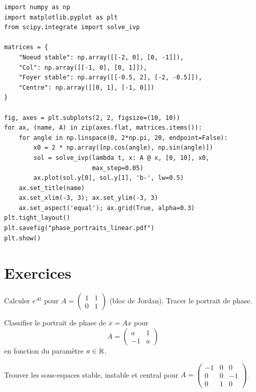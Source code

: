 \begin{codeblock}[title=\textbf{Portraits de phase pour diff\'erentes matrices}]
\begin{verbatim}
import numpy as np
import matplotlib.pyplot as plt
from scipy.integrate import solve_ivp

matrices = {
    "Noeud stable": np.array([[-2, 0], [0, -1]]),
    "Col": np.array([[-1, 0], [0, 1]]),
    "Foyer stable": np.array([[-0.5, 2], [-2, -0.5]]),
    "Centre": np.array([[0, 1], [-1, 0]])
}

fig, axes = plt.subplots(2, 2, figsize=(10, 10))
for ax, (name, A) in zip(axes.flat, matrices.items()):
    for angle in np.linspace(0, 2*np.pi, 20, endpoint=False):
        x0 = 2 * np.array([np.cos(angle), np.sin(angle)])
        sol = solve_ivp(lambda t, x: A @ x, [0, 10], x0,
                        max_step=0.05)
        ax.plot(sol.y[0], sol.y[1], 'b-', lw=0.5)
    ax.set_title(name)
    ax.set_xlim(-3, 3); ax.set_ylim(-3, 3)
    ax.set_aspect('equal'); ax.grid(True, alpha=0.3)
plt.tight_layout()
plt.savefig("phase_portraits_linear.pdf")
plt.show()
\end{verbatim}
\end{codeblock}

\section{Exercices}

\begin{exercice}
Calculer $e^{At}$ pour $A = \begin{pmatrix} 1 & 1 \\ 0 & 1 \end{pmatrix}$
(bloc de Jordan). Tracer le portrait de phase.
\end{exercice}

\begin{exercice}[Classification]
Classifier le portrait de phase de $\dot{x} = Ax$ pour
\[
    A = \begin{pmatrix} a & 1 \\ -1 & a \end{pmatrix}
\]
en fonction du param\`etre $a \in \mathbb{R}$.
\end{exercice}

\begin{exercice}[Dimension 3]
Trouver les sous-espaces stable, instable et central pour
$A = \begin{pmatrix} -1 & 0 & 0 \\ 0 & 0 & -1 \\ 0 & 1 & 0 \end{pmatrix}$.
\end{exercice}

